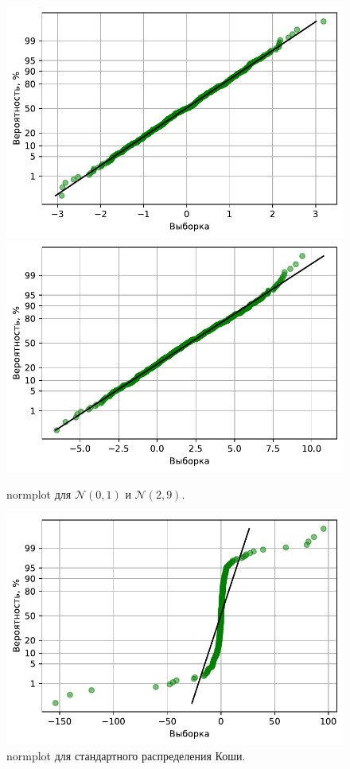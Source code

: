 \documentclass[16pt]{article}
\begin{document}
\begin{figure}[h]
	\center
	\includegraphics[scale=0.5]{4_2.pdf}
	\hfill
	\includegraphics[scale=0.5]{4_3.pdf}
	\caption{normplot для $\mathcal{N}(0, 1)$ и $\mathcal{N}(2, 9)$.}
\end{figure}

\begin{figure}[h]
	\center
	\includegraphics[scale=0.7]{4_4.pdf}
	\caption{normplot для стандартного распределения Коши.}
\end{figure}
\end{document}
